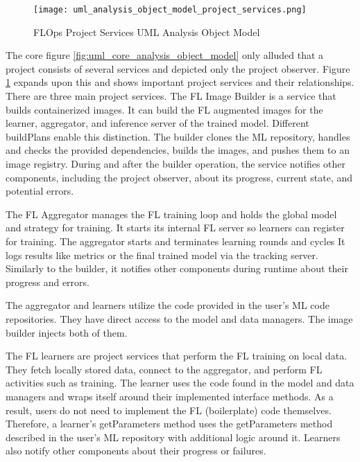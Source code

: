 \begin{figure}[h]
    \centering
    \texttt{[image: uml\_analysis\_object\_model\_project\_services.png]}
    \caption{FLOps Project Services UML Analysis Object Model}
    \label{fig:uml_project_services_analysis_object_model}
\end{figure}

The core figure \ref{fig:uml_core_analysis_object_model} only alluded that a project consists of several services and depicted only the project observer.
Figure \ref{fig:uml_project_services_analysis_object_model} expands upon this and shows important project services and their relationships.
There are three main project services.
The FL Image Builder is a service that builds containerized images.
It can build the FL augmented images for the learner, aggregator, and inference server of the trained model.
Different buildPlans enable this distinction.
The builder clones the ML repository, handles and checks the provided dependencies, builds the images, and pushes them to an image registry.
During and after the builder operation, the service notifies other components, including the project observer, about its progress, current state, and potential errors.

The FL Aggregator manages the FL training loop and holds the global model and strategy for training.
It starts its internal FL server so learners can register for training.
The aggregator starts and terminates learning rounds and cycles
It logs results like metrics or the final trained model via the tracking server.
Similarly to the builder, it notifies other components during runtime about their progress and errors.

The aggregator and learners utilize the code provided in the user's ML code repositories.
They have direct access to the model and data managers.
The image builder injects both of them.

The FL learners are project services that perform the FL training on local data.
They fetch locally stored data, connect to the aggregator, and perform FL activities such as training.
The learner uses the code found in the model and data managers and wraps itself around their implemented interface methods.
As a result, users do not need to implement the FL (boilerplate) code themselves.
Therefore, a learner's getParameters method uses the getParameters method described in the user's ML repository with additional logic around it.
Learners also notify other components about their progress or failures.

